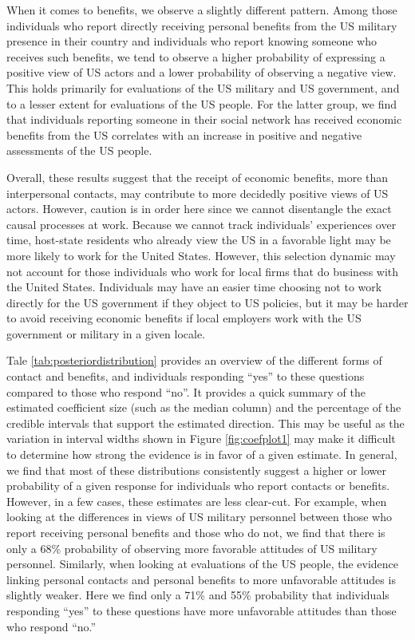 When it comes to benefits, we observe a slightly different pattern. Among those individuals who report directly receiving personal benefits from the US military presence in their country and individuals who report knowing someone who receives such benefits, we tend to observe a higher probability of expressing a positive view of US actors and a lower probability of observing a negative view. This holds primarily for evaluations of the US military and US government, and to a lesser extent for evaluations of the US people. For the latter group, we find that individuals reporting someone in their social network has received economic benefits from the US correlates with an increase in positive and negative assessments of the US people. 

Overall, these results suggest that the receipt of economic benefits, more than interpersonal contacts, may contribute to more decidedly positive views of US actors. However, caution is in order here since we cannot disentangle the exact causal processes at work. Because we cannot track individuals' experiences over time, host-state residents who already view the US in a favorable light may be more likely to work for the United States. However, this selection dynamic may not account for those individuals who work for local firms that do business with the United States. Individuals may have an easier time choosing not to work directly for the US government if they object to US policies, but it may be harder to avoid receiving economic benefits if local employers work with the US government or military in a given locale. 

Tale \ref{tab:posteriordistribution} provides an overview of the different forms of contact and benefits, and individuals responding ``yes'' to these questions compared to those who respond ``no''. It provides a quick summary of the estimated coefficient size (such as the median column) and the percentage of the credible intervals that support the estimated direction. This may be useful as the variation in interval widths shown in Figure \ref{fig:coefplot1} may make it difficult to determine how strong the evidence is in favor of a given estimate. In general, we find that most of these distributions consistently suggest a higher or lower probability of a given response for individuals who report contacts or benefits. However, in a few cases, these estimates are less clear-cut. For example, when looking at the differences in views of US military personnel between those who report receiving personal benefits and those who do not, we find that there is only a 68\% probability of observing more favorable attitudes of US military personnel. Similarly, when looking at evaluations of the US people, the evidence linking personal contacts and personal benefits to more unfavorable attitudes is slightly weaker. Here we find only a 71\% and 55\% probability that individuals responding ``yes'' to these questions have more unfavorable attitudes than those who respond ``no.''


